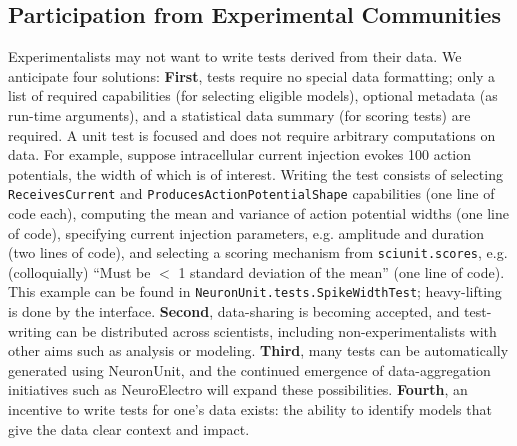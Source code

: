 \documentclass{frontiersSCNS}
\let\verbx\lstinline
\begin{document}
\subsection{Participation from Experimental Communities}
Experimentalists may not want to write tests derived from their data.  We anticipate four solutions: \textbf{First}, tests require no special data formatting; only a list of required  capabilities (for selecting eligible models), optional metadata (as run-time arguments), and a statistical data summary (for scoring tests) are required.  A unit test is focused and does not require arbitrary computations on data.  For example, suppose intracellular current injection evokes 100 action potentials, the width of which is of interest.  Writing the test consists of selecting \verbx{ReceivesCurrent} and \verbx{ProducesActionPotentialShape} capabilities (one line of code each), computing the mean and variance of action potential widths (one line of code), specifying current injection parameters, e.g. amplitude and duration (two lines of code), and selecting a scoring mechanism from \verbx{sciunit.scores}, e.g. (colloquially) ``Must be $<$ 1 standard deviation of the mean'' (one line of code).  This example can be found in \verbx{NeuronUnit.tests.SpikeWidthTest}; heavy-lifting is done by the interface.
\textbf{Second}, data-sharing is becoming accepted, and test-writing can be distributed across scientists, including non-experimentalists with other aims such as analysis or modeling. 
\textbf{Third}, many tests can be automatically generated using NeuronUnit, and the continued emergence of data-aggregation initiatives such as NeuroElectro will expand these possibilities. 
\textbf{Fourth}, an incentive to write tests for one's data exists: the ability to identify models that give the data clear context and impact. 
\end{document}
